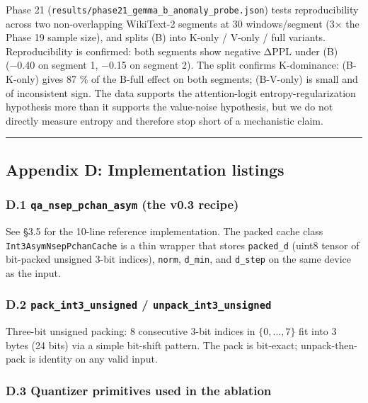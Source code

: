 \documentclass[
]{article}
\begin{document}
Phase 21 (\texttt{results/phase21\_gemma\_b\_anomaly\_probe.json}) tests
reproducibility across two non-overlapping WikiText-2 segments at 30
windows/segment (3× the Phase 19 sample size), and splits (B) into
K-only / V-only / full variants. Reproducibility is confirmed: both
segments show negative ΔPPL under (B) (−0.40 on segment 1, −0.15 on
segment 2). The split confirms K-dominance: (B-K-only) gives 87 \% of
the B-full effect on both segments; (B-V-only) is small and of
inconsistent sign. The data supports the attention-logit
entropy-regularization hypothesis more than it supports the value-noise
hypothesis, but we do not directly measure entropy and therefore stop
short of a mechanistic claim.

\begin{center}\rule{0.5\linewidth}{0.5pt}\end{center}

\subsection{Appendix D: Implementation
listings}\label{appendix-d-implementation-listings}

\subsubsection{\texorpdfstring{D.1 \texttt{qa\_nsep\_pchan\_asym} (the
v0.3
recipe)}{D.1 qa\_nsep\_pchan\_asym (the v0.3 recipe)}}\label{d.1-qa_nsep_pchan_asym-the-v0.3-recipe}

See §3.5 for the 10-line reference implementation. The packed cache
class \texttt{Int3AsymNsepPchanCache} is a thin wrapper that stores
\texttt{packed\_d} (uint8 tensor of bit-packed unsigned 3-bit indices),
\texttt{norm}, \texttt{d\_min}, and \texttt{d\_step} on the same device
as the input.

\subsubsection{\texorpdfstring{D.2 \texttt{pack\_int3\_unsigned} /
\texttt{unpack\_int3\_unsigned}}{D.2 pack\_int3\_unsigned / unpack\_int3\_unsigned}}\label{d.2-pack_int3_unsigned-unpack_int3_unsigned}

Three-bit unsigned packing: 8 consecutive 3-bit indices in
\(\{0, \dots, 7\}\) fit into 3 bytes (24 bits) via a simple bit-shift
pattern. The pack is bit-exact; unpack-then-pack is identity on any
valid input.

\subsubsection{D.3 Quantizer primitives used in the
ablation}\label{d.3-quantizer-primitives-used-in-the-ablation}
\end{document}
